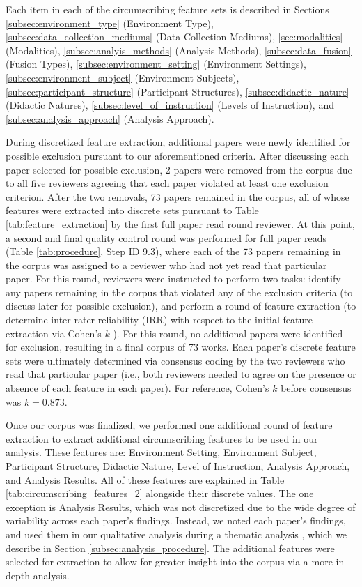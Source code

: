 \documentclass[manuscript,screen,review]{acmart}
\begin{document}
Each item in each of the circumscribing feature sets is described in Sections \ref{subsec:environment_type} (Environment Type), \ref{subsec:data_collection_mediums} (Data Collection Mediums), \ref{sec:modalities} (Modalities), \ref{subsec:analyis_methods} (Analysis Methods), \ref{subsec:data_fusion} (Fusion Types), \ref{subsec:environment_setting} (Environment Settings), \ref{subsec:environment_subject} (Environment Subjects), \ref{subsec:participant_structure} (Participant Structures), \ref{subsec:didactic_nature} (Didactic Natures), \ref{subsec:level_of_instruction} (Levels of Instruction), and \ref{subsec:analysis_approach} (Analysis Approach).

During discretized feature extraction, additional papers were newly identified for possible exclusion pursuant to our aforementioned criteria. After discussing each paper selected for possible exclusion, 2 papers were removed from the corpus due to all five reviewers agreeing that each paper violated at least one exclusion criterion. After the two removals, 73 papers remained in the corpus, all of whose features were extracted into discrete sets pursuant to Table \ref{tab:feature_extraction} by the first full paper read round reviewer. At this point, a second and final quality control round was performed for full paper reads (Table \ref{tab:procedure}, Step ID 9.3), where each of the 73 papers remaining in the corpus was assigned to a reviewer who had not yet read that particular paper. For this round, reviewers were instructed to perform two tasks: identify any papers remaining in the corpus that violated any of the exclusion criteria (to discuss later for possible exclusion), and perform a round of feature extraction (to determine inter-rater reliability (IRR) with respect to the initial feature extraction via Cohen's $k$ \cite{cohen1960coefficient}). For this round, no additional papers were identified for exclusion, resulting in a final corpus of 73 works. Each paper's discrete feature sets were ultimately determined via consensus coding \cite{chinh2019ways} by the two reviewers who read that particular paper (i.e., both reviewers needed to agree on the presence or absence of each feature in each paper). For reference, Cohen's $k$ before consensus was $k=0.873$.  

Once our corpus was finalized, we performed one additional round of feature extraction to extract additional circumscribing features to be used in our analysis. These features are: Environment Setting, Environment Subject, Participant Structure, Didactic Nature, Level of Instruction, Analysis Approach, and Analysis Results. All of these features are explained in Table \ref{tab:circumscribing_features_2} alongside their discrete values. The one exception is Analysis Results, which was not discretized due to the wide degree of variability across each paper's findings. Instead, we noted each paper's findings, and used them in our qualitative analysis during a thematic analysis \cite{braun2012thematic}, which we describe in Section \ref{subsec:analysis_procedure}. The additional features were selected for extraction to allow for greater insight into the corpus via a more in depth analysis.
\end{document}

